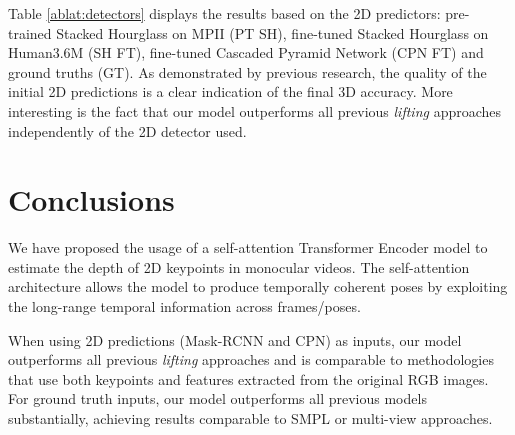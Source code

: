 \documentclass[letterpaper]{article}
\begin{document}
Table \ref{ablat:detectors} displays the results based on the 2D predictors: pre-trained Stacked Hourglass on MPII (PT SH), fine-tuned Stacked Hourglass on Human3.6M (SH FT), fine-tuned Cascaded Pyramid Network (CPN FT) and ground truths (GT). As demonstrated by previous research, the quality of the initial 2D predictions is a clear indication of the final 3D accuracy. More interesting is the fact that our model outperforms all previous \textit{lifting} approaches independently of the 2D detector used.



\section{Conclusions}
We have proposed the usage of a self-attention Transformer Encoder model to estimate the depth of 2D keypoints in monocular videos. The self-attention architecture allows the model to produce temporally coherent poses by exploiting the long-range temporal information across frames/poses.

When using 2D predictions (Mask-RCNN and CPN) as inputs, our model outperforms all previous \textit{lifting} approaches and is comparable to methodologies that use both keypoints and features extracted from the original RGB images. For ground truth inputs, our model outperforms all previous models substantially, achieving results comparable to SMPL or multi-view approaches.



\clearpage
\printbibliography
\end{document}

